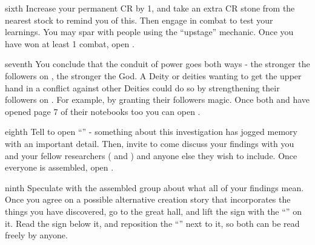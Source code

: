\documentclass[notebook]{GL2020} %
\begin{document}
\begin{page}{sixth}
Increase your permanent CR by 1, and take an extra CR stone from the nearest stock to remind you of this. Then engage in combat to test your learnings. You may spar with people using the ``upstage'' mechanic. Once you have won at least 1 combat, open .
\end{page}

\begin{page}{seventh}
You conclude that the conduit of power goes both ways - the stronger the followers on \pEarth{}, the stronger the God. A Deity or deities wanting to get the upper hand in a conflict against other Deities could do so by strengthening their followers on \pEarth{}. For example, by granting their followers magic. Once both \cScholarship{} and \cEbbPriest{} have opened page 7 of their notebooks too you can open .
\end{page}

\begin{page}{eighth}
Tell \cHistory{} to open \cHistory{\their} “\mWTwo{}” - something about this investigation has jogged \cHistory{\their} memory with an important detail. Then, invite \cHistory{} to come discuss your findings with you and your fellow researchers ( \cScholarship{} and \cEbbPriest{}) and anyone else they wish to include.  Once everyone is assembled, open .
\end{page}

\begin{page}{ninth}
Speculate with the assembled group about what all of your findings mean. Once you agree on a possible alternative creation story that incorporates the things you have discovered, go to the great hall, and lift the sign with the ``\sCreationMythOfficial{}'' on it. Read the sign below it, and reposition the ``\sCreationMythOfficial{}'' next to it, so both can be read freely by anyone.
\end{page}

\endnotebook
\end{document}
